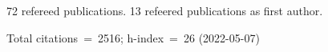 72 refereed publications. 13 refeered publications as first author.

Total citations~=~2516; h-index~=~26 (2022-05-07)